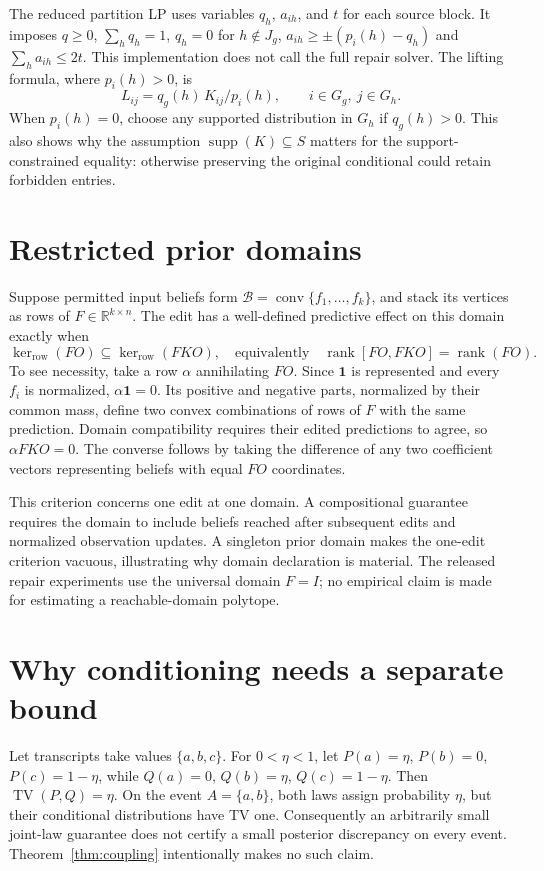 \documentclass[11pt,letterpaper]{article}
\newcommand{\one}{\mathbf{1}}
\newcommand{\TV}{\operatorname{TV}}
\newcommand{\rank}{\operatorname{rank}}
\begin{document}
The reduced partition LP uses variables $q_h$, $a_{ih}$, and $t$ for each source block. It imposes $q\ge0$, $\sum_hq_h=1$, $q_h=0$ for $h\notin J_g$, $a_{ih}\ge\pm(p_i(h)-q_h)$ and $\sum_h a_{ih}\le2t$. This implementation does not call the full repair solver. The lifting formula, where $p_i(h)>0$, is
\begin{equation}
L_{ij}=q_g(h)\,K_{ij}/p_i(h),\qquad i\in G_g,\ j\in G_h.
\end{equation}
When $p_i(h)=0$, choose any supported distribution in $G_h$ if $q_g(h)>0$. This also shows why the assumption $\operatorname{supp}(K)\subseteq S$ matters for the support-constrained equality: otherwise preserving the original conditional could retain forbidden entries.

\section{Restricted prior domains}\label{app:domains}
Suppose permitted input beliefs form $\mathcal B=\operatorname{conv}\{f_1,\ldots,f_k\}$, and stack its vertices as rows of $F\in\mathbb R^{k\times n}$. The edit has a well-defined predictive effect on this domain exactly when
\begin{equation}
\ker_{\mathrm{row}}(FO)\subseteq\ker_{\mathrm{row}}(FKO),
\quad\text{equivalently}\quad
\rank[FO,FKO]=\rank(FO).
\end{equation}
To see necessity, take a row $\alpha$ annihilating $FO$. Since $\one$ is represented and every $f_i$ is normalized, $\alpha\one=0$. Its positive and negative parts, normalized by their common mass, define two convex combinations of rows of $F$ with the same prediction. Domain compatibility requires their edited predictions to agree, so $\alpha FKO=0$. The converse follows by taking the difference of any two coefficient vectors representing beliefs with equal $FO$ coordinates.

This criterion concerns one edit at one domain. A compositional guarantee requires the domain to include beliefs reached after subsequent edits and normalized observation updates. A singleton prior domain makes the one-edit criterion vacuous, illustrating why domain declaration is material. The released repair experiments use the universal domain $F=I$; no empirical claim is made for estimating a reachable-domain polytope.

\section{Why conditioning needs a separate bound}\label{app:conditioning}
Let transcripts take values $\{a,b,c\}$. For $0<\eta<1$, let $P(a)=\eta$, $P(b)=0$, $P(c)=1-\eta$, while $Q(a)=0$, $Q(b)=\eta$, $Q(c)=1-\eta$. Then $\TV(P,Q)=\eta$. On the event $A=\{a,b\}$, both laws assign probability $\eta$, but their conditional distributions have TV one. Consequently an arbitrarily small joint-law guarantee does not certify a small posterior discrepancy on every event. Theorem~\ref{thm:coupling} intentionally makes no such claim.
\end{document}
